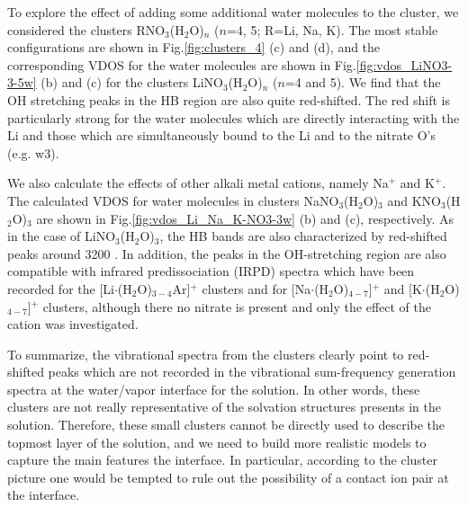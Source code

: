 To explore the effect of adding some additional water molecules to
the cluster, we considered the clusters RNO$_3$(H$_2$O)$_n$ ($n$=4, 5; R=Li, Na, K).
The most stable configurations are shown in Fig.\thinspace\ref{fig:clusters_4} (c) and (d),
and the corresponding VDOS for the water molecules are shown in
Fig.\thinspace\ref{fig:vdos_LiNO3-3-5w} (b) and (c) for the clusters LiNO$_3$(H$_2$O)$_n$
($n$=4 and 5). We find that the OH stretching peaks in the HB region are also quite red-shifted.
The red shift is particularly strong for the water molecules which are directly interacting with
the Li and those which are simultaneously bound to the Li and to the nitrate O's (e.g. w3).

%

We also calculate the effects of other alkali metal cations, namely Na$^+$ and K$^+$. 
The calculated VDOS for water molecules in clusters NaNO$_3$(H$_2$O)$_3$ and KNO$_3$(H$_2$O)$_3$ are shown in 
Fig.\thinspace\ref{fig:vdos_Li_Na_K-NO3-3w} (b) and (c), respectively. As in the case of LiNO$_3$(H$_2$O)$_3$, the HB 
bands are also characterized by red-shifted peaks around 3200 \centimeter.
In addition, the peaks in the OH-stretching region are also compatible with infrared predissociation
(IRPD) spectra which have been recorded for the [Li$\cdot$(H$_2$O)$_{3-4}$Ar]$^+$
clusters \cite{rodriguez2011, Miller2008, Miller2008b}
and for [Na$\cdot$(H$_2$O)$_{4-7}$]$^+$ and [K$\cdot$(H$_2$O)$_{4-7}$]$^+$ clusters, \cite{beck2011} although there no
nitrate is present and only the effect of the cation was investigated.

To summarize, the vibrational spectra from the clusters clearly point to red-shifted peaks which are not 
recorded in the vibrational sum-frequency generation spectra at the water/vapor interface for the \LiN solution. 
In other words, these clusters are not really representative of the solvation structures presents in the \LiN solution.
Therefore, these small clusters cannot be directly used to describe the topmost layer of the \LiN solution, 
and we need to build more realistic models to capture the main features the interface. 
In particular, according to the cluster picture one would be tempted to rule out the possibility of a contact 
ion pair at the interface.

